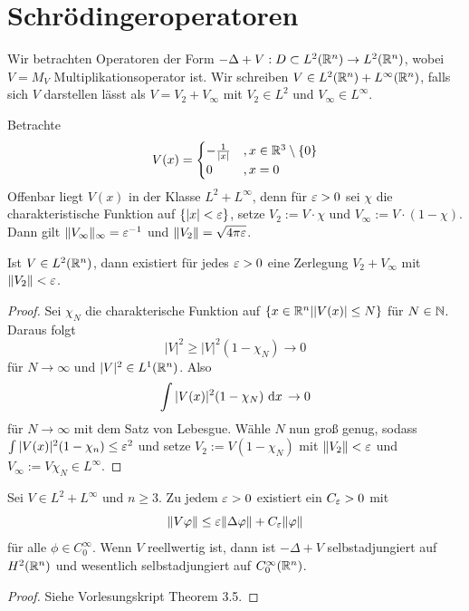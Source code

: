 \documentclass{mycourse}
\begin{document}
\section{Schrödingeroperatoren}

Wir betrachten Operatoren der Form $-\Delta+V:D\subset L^2(\mathbb{R}^n) \to L^2(\mathbb{R}^n)$, wobei $V=M_V$ Multiplikationsoperator ist. Wir schreiben $V\in L^2(\mathbb{R}^n)+L^\infty(\mathbb{R}^n)$, falls sich $V$ darstellen lässt als $V=V_2+V_\infty$ mit $V_2\in L^2$ und $V_\infty \in L^\infty$.

\begin{ex*}[Coloumbpotential]
Betrachte
\[
V(x)=\begin{cases} - \frac{1}{|x|}&, x\in \R^3\setminus\{0\}\\ 0&, x=0 \end{cases}
\]
Offenbar liegt $V(x)$ in der Klasse $L^2+L^\infty$, denn für $\varepsilon>0$ sei $\chi$ die charakteristische Funktion auf $\{|x|<\varepsilon\}$, setze $V_2:= V \cdot \chi$ und $V_\infty:= V\cdot (1-\chi)$. Dann gilt $\|V_\infty\|_\infty=\varepsilon^{-1}$ und $\|V_2\|=\sqrt{4\pi \varepsilon}$.
\end{ex*}

\begin{lem}
Ist $V\in L^2(\mathbb{R}^n)$, dann existiert für jedes $\varepsilon>0$ eine Zerlegung $V_2+V_\infty$ mit $\| V_2\| <\varepsilon$.
\end{lem}
\begin{proof} %
Sei $\chi_N$ die charakterische Funktion auf $\{x\in \mathbb{R}^n| |V(x)|\le N\}$ für $N \in \mathbb{N}$. Daraus folgt
\[
|V|^2 \ge |V|^2(1-\chi_N) \to 0
\]
für $N\to \infty$ und $|V|^2 \in L^1(\mathbb{R}^n)$. Also
\[
\int |V(x)|^2 (1- \chi_N) \, \,\mathrm{d}x\, \to 0
\]
für $N\to \infty$ mit dem Satz von Lebesgue. Wähle $N$ nun groß genug, sodass $\int | V(x)|^2 (1- \chi_n) \le \varepsilon^2$ und setze $V_2:= V(1-\chi_N) $ mit $\| V_2\| < \varepsilon$ und $V_\infty := V\chi_N \in L^\infty$.
\end{proof}
\begin{st}\label{5.11}
Sei $V\in L^2+ L^\infty$ und $n\ge 3$. Zu jedem $\varepsilon >0$ existiert ein $C_\varepsilon>0$ mit
\begin{equation}\label{4.2}
\| V\varphi\| \le \varepsilon \| \Delta \varphi\| + C_\varepsilon \| \varphi\| 
\end{equation}
für alle $\phi \in C_0^\infty$. Wenn $V$ reellwertig ist, dann ist $-\Delta+V$ selbstadjungiert auf $H^2(\mathbb{R}^n)$ und wesentlich selbstadjungiert auf $C_0^\infty(\mathbb{R}^n)$.
\end{st}
\begin{proof}
Siehe Vorlesungskript Theorem 3.5.
\end{proof}
\end{document}
